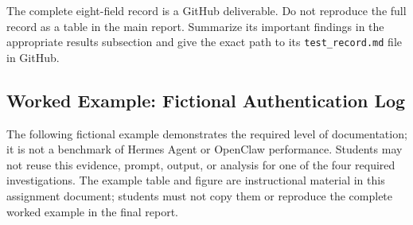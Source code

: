 \documentclass[12pt,letterpaper]{article}
\begin{document}
The complete eight-field record is a GitHub deliverable. Do not reproduce the full record as a table in the main report. Summarize its important findings in the appropriate results subsection and give the exact path to its \texttt{test\_record.md} file in GitHub.

\subsection{Worked Example: Fictional Authentication Log}
The following fictional example demonstrates the required level of documentation; it is not a benchmark of Hermes Agent or OpenClaw performance. Students may not reuse this evidence, prompt, output, or analysis for one of the four required investigations. The example table and figure are instructional material in this assignment document; students must not copy them or reproduce the complete worked example in the final report.
\end{document}
